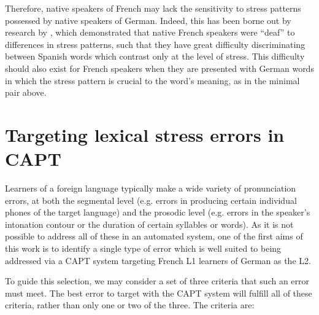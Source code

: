 		Therefore, native speakers of French may lack the sensitivity to stress patterns possessed by native speakers of German. Indeed, this has been borne out by research by \citeauthor{Dupoux2008} \citep{Dupoux2001,Dupoux2008}, which demonstrated that native French speakers were ``deaf'' to differences in stress patterns, such that they have great difficulty discriminating between Spanish words which contrast only at the level of stress. This difficulty should also exist for French speakers when they are presented with German words in which the stress pattern is crucial to the word's meaning, as in the minimal pair above.
		
%		
%		
		
		
 \section{Targeting lexical stress errors in CAPT}
 \label{sec:bkgd:targeting}
 	Learners of a foreign language typically make a wide variety of pronunciation errors, at both the segmental level (e.g. errors in producing certain individual phones of the target language) and the prosodic level (e.g. errors in the speaker's intonation contour or the duration of certain syllables or words). As it is not possible to address all of these in an automated system, one of the first aims of this work is to identify a single type of error which is well suited to being addressed via a CAPT system targeting French L1 learners of German as the L2. 
	
	To guide this selection, we may consider %
a set of three criteria that such an error must meet. 
The best error to target with the CAPT system will fulfill all of these criteria, rather than only one or two of the three. The criteria are:

